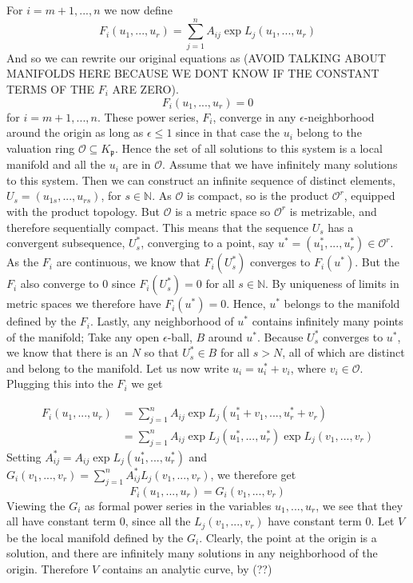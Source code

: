 \documentclass{article}
\newcommand{\mfrak}[1]{\mathfrak{#1}}
\newcommand{\mcal}[1]{\mathcal{#1}}
\newcommand{\mbb}[1]{\mathbb{#1}}
\begin{document}
For $i = m+1, ..., n$ we now define
$$F_i(u_1, ..., u_r) = \sum_{j = 1}^n A_{ij} \exp L_j(u_1, ..., u_r) $$
And so we can rewrite our original equations as
(AVOID TALKING ABOUT MANIFOLDS HERE BECAUSE WE DONT KNOW IF THE CONSTANT TERMS OF THE $F_i$ ARE ZERO).
$$F_i(u_1, ..., u_r) = 0$$
for $i = m+1, ..., n$. These power series, $F_i$, converge in any $\epsilon$-neighborhood around the origin as long as $\epsilon \leq 1$ since in that case the $u_i$ belong to the valuation ring $\mcal O \subseteq K_\mfrak p$. Hence the set of all solutions to this system is a local manifold and all the $u_i$ are in $\mcal O$. Assume that we have infinitely many solutions to this system. Then we can construct an infinite sequence of distinct elements, $U_s = (u_{1s}, ..., u_{rs})$, for $s \in \mbb N$.
As $\mcal O$ is compact, so is the product $\mcal O^r$, equipped with the product topology. But $\mcal O$ is a metric space so $\mcal O^r$ is metrizable, and therefore sequentially compact. This means that the sequence $U_s$ has a convergent subsequence, $U^*_s$, converging to a point, say $u^* = (u_1^*, ..., u_r^*) \in \mcal O^r$. As the $F_i$ are continuous, we know that $F_i(U^*_s)$ converges to $F_i(u^*)$. But the $F_i$ also converge to 0 since $F_i(U^*_s) = 0$ for all $s \in \mbb N$. By uniqueness of limits in metric spaces we therefore have $F_i(u^*) = 0$. Hence, $u^*$ belongs to the manifold defined by the $F_i$. Lastly, any neighborhood of $u^*$ contains infinitely many points of the manifold; Take any open $\epsilon$-ball, $B$ around $u^*$. Because $U^*_s$ converges to $u^*$, we know that there is an $N$ so that $U^*_s \in B$ for all $s > N$, all of which are distinct and belong to the manifold. Let us now write $u_i = u_i^* + v_i$, where $v_i \in \mcal O$. Plugging this into the $F_i$ we get

\begin{align*}
    F_i(u_1, ..., u_r) &= \sum_{j = 1}^n A_{ij} \exp L_j(u_1^* + v_1, ..., u_r^* + v_r) \\ 
    &= \sum_{j = 1}^n A_{ij} \exp L_j(u_1^*, ..., u_r^*) \exp L_j(v_1, ..., v_r)
\end{align*}
Setting $A_{ij}^* = A_{ij} \exp L_j(u_1^*, ..., u_r^*)$ and $G_i(v_1, ..., v_r) = \sum_{j = 1}^n A_{ij}^* L_j(v_1, ..., v_r)$, we therefore get
$$F_i(u_1, ..., u_r) = G_i(v_1, ..., v_r)$$
Viewing the $G_i$ as formal power series in the variables $u_1, ..., u_r$, we see that they all have constant term 0, since all the $L_j(v_1, ..., v_r)$ have constant term 0. Let $V$ be the local manifold defined by the $G_i$. Clearly, the point at the origin is a solution, and there are infinitely many solutions in any neighborhood of the origin. Therefore $V$ contains an analytic curve, by (??)
\end{document}
